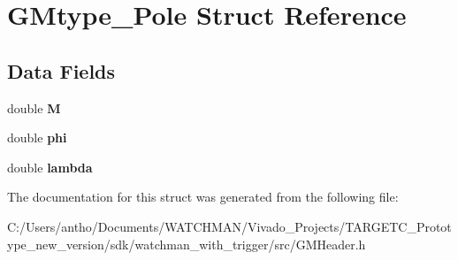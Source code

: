 \section{G\+Mtype\+\_\+\+Pole Struct Reference}
\label{struct_g_mtype___pole}
\subsection*{Data Fields}
\begin{DoxyCompactItemize}
\item 
\mbox{\label{struct_g_mtype___pole_abb04f5f017f41f350a3d81fecdbfa762}} 
double {\bfseries M}
\item 
\mbox{\label{struct_g_mtype___pole_adae8d8a6ff28515e505bb1c07f2b33c8}} 
double {\bfseries phi}
\item 
\mbox{\label{struct_g_mtype___pole_a3db359547eed8cfd48ca821d95f577af}} 
double {\bfseries lambda}
\end{DoxyCompactItemize}


The documentation for this struct was generated from the following file\+:\begin{DoxyCompactItemize}
\item 
C\+:/\+Users/antho/\+Documents/\+W\+A\+T\+C\+H\+M\+A\+N/\+Vivado\+\_\+\+Projects/\+T\+A\+R\+G\+E\+T\+C\+\_\+\+Prototype\+\_\+new\+\_\+version/sdk/watchman\+\_\+with\+\_\+trigger/src/G\+M\+Header.\+h\end{DoxyCompactItemize}
